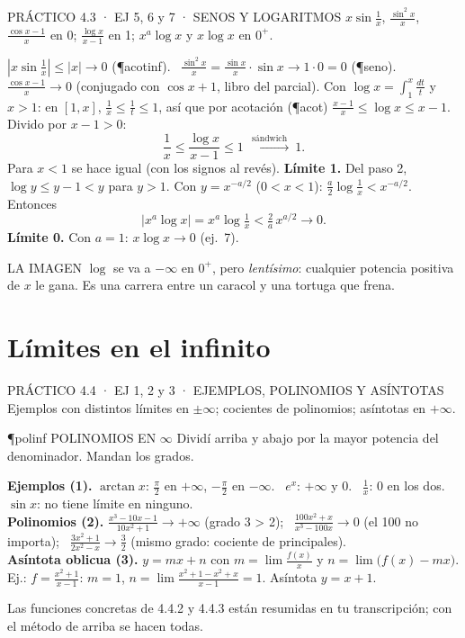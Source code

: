\begin{enunciado}{PRÁCTICO 4.3 · EJ 5, 6 y 7 · SENOS Y LOGARITMOS}
$x\sin\frac1x$, $\frac{\sin^2x}x$, $\frac{\cos x-1}x$ en 0; $\frac{\log x}{x-1}$ en 1; $x^a\log x$ y $x\log x$ en $0^+$.
\end{enunciado}
$|x\sin\frac1x|\le|x|\to0$ (\P{acotinf}). \ $\frac{\sin^2x}x=\frac{\sin x}x\cdot\sin x\to1\cdot0=0$ (\P{seno}). \ $\frac{\cos x-1}x\to0$ (conjugado con $\cos x+1$, libro del parcial).
Con $\log x=\int_1^x\frac{dt}t$ y $x>1$: en $[1,x]$, $\frac1x\le\frac1t\le1$, así que por acotación (\P{acot}) $\frac{x-1}x\le\log x\le x-1$. Divido por $x-1>0$:
\[\frac1x\le\frac{\log x}{x-1}\le1\ \xrightarrow{\ \text{sándwich}\ }\ 1.\]
Para $x<1$ se hace igual (con los signos al revés). \textbf{Límite 1.}
Del paso 2, $\log y\le y-1<y$ para $y>1$. Con $y=x^{-a/2}$ ($0<x<1$): $\frac a2\log\frac1x<x^{-a/2}$. Entonces
\[|x^a\log x|=x^a\log\tfrac1x<\tfrac2a\,x^{a/2}\to0.\]
\textbf{Límite 0.} Con $a=1$: $x\log x\to0$ (ej.\ 7).
\begin{tip}{LA IMAGEN}
$\log$ se va a $-\infty$ en $0^+$, pero \emph{lentísimo}: cualquier potencia positiva de $x$ le gana. Es una carrera entre un caracol y una tortuga que frena.
\end{tip}

\section{Límites en el infinito}

\begin{enunciado}{PRÁCTICO 4.4 · EJ 1, 2 y 3 · EJEMPLOS, POLINOMIOS Y ASÍNTOTAS}
Ejemplos con distintos límites en $\pm\infty$; cocientes de polinomios; asíntotas en $+\infty$.
\end{enunciado}
\begin{uso}{\P{polinf} POLINOMIOS EN $\infty$}
Dividí arriba y abajo por la mayor potencia del denominador. Mandan los grados.
\end{uso}
\textbf{Ejemplos (1).} $\arctan x$: $\frac\pi2$ en $+\infty$, $-\frac\pi2$ en $-\infty$. \ $e^x$: $+\infty$ y $0$. \ $\frac1x$: 0 en los dos. \ $\sin x$: no tiene límite en ninguno.\\[2pt]
\textbf{Polinomios (2).} $\frac{x^3-10x-1}{10x^2+1}\to+\infty$ (grado 3 > 2); \ $\frac{100x^2+x}{x^3-100x}\to0$ (el 100 no importa); \ $\frac{3x^2+1}{2x^2-x}\to\frac32$ (mismo grado: cociente de principales).\\[2pt]
\textbf{Asíntota oblicua (3).} $y=mx+n$ con $m=\lim\frac{f(x)}x$ y $n=\lim\big(f(x)-mx\big)$. Ej.: $f=\frac{x^2+1}{x-1}$: $m=1$, $n=\lim\frac{x^2+1-x^2+x}{x-1}=1$. Asíntota $y=x+1$.
\begin{falta}
Las funciones concretas de 4.4.2 y 4.4.3 están resumidas en tu transcripción; con el método de arriba se hacen todas.
\end{falta}

